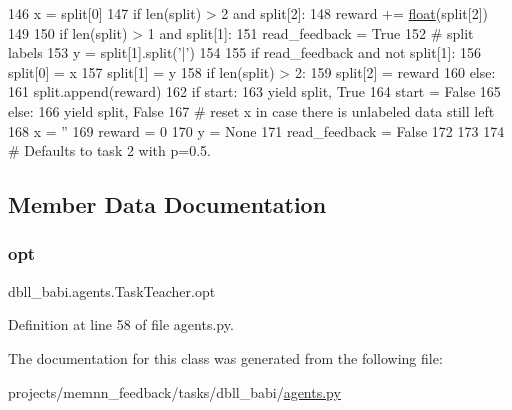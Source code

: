 \begin{DoxyCode}
146                         x = split[0]
147                 \textcolor{keywordflow}{if} len(split) > 2 \textcolor{keywordflow}{and} split[2]:
148                     reward += \hyperlink{namespaceprojects_1_1controllable__dialogue_1_1make__control__dataset_aa2b7207688c641dbc094ab44eca27113}{float}(split[2])
149 
150                 \textcolor{keywordflow}{if} len(split) > 1 \textcolor{keywordflow}{and} split[1]:
151                     read\_feedback = \textcolor{keyword}{True}
152                     \textcolor{comment}{# split labels}
153                     y = split[1].split(\textcolor{stringliteral}{'|'})
154 
155                 \textcolor{keywordflow}{if} read\_feedback \textcolor{keywordflow}{and} \textcolor{keywordflow}{not} split[1]:
156                     split[0] = x
157                     split[1] = y
158                     \textcolor{keywordflow}{if} len(split) > 2:
159                         split[2] = reward
160                     \textcolor{keywordflow}{else}:
161                         split.append(reward)
162                     \textcolor{keywordflow}{if} start:
163                         \textcolor{keywordflow}{yield} split, \textcolor{keyword}{True}
164                         start = \textcolor{keyword}{False}
165                     \textcolor{keywordflow}{else}:
166                         \textcolor{keywordflow}{yield} split, \textcolor{keyword}{False}
167                     \textcolor{comment}{# reset x in case there is unlabeled data still left}
168                     x = \textcolor{stringliteral}{''}
169                     reward = 0
170                     y = \textcolor{keywordtype}{None}
171                     read\_feedback = \textcolor{keyword}{False}
172 
173 
174 \textcolor{comment}{# Defaults to task 2 with p=0.5.}
\end{DoxyCode}


\subsection{Member Data Documentation}
\mbox{\label{classdbll__babi_1_1agents_1_1TaskTeacher_abe6872d5eda75ca8a15ecf4785086c48}} 
\subsubsection{\texorpdfstring{opt}{opt}}
{\footnotesize\ttfamily dbll\+\_\+babi.\+agents.\+Task\+Teacher.\+opt}



Definition at line 58 of file agents.\+py.



The documentation for this class was generated from the following file\+:\begin{DoxyCompactItemize}
\item 
projects/memnn\+\_\+feedback/tasks/dbll\+\_\+babi/\hyperlink{projects_2memnn__feedback_2tasks_2dbll__babi_2agents_8py}{agents.\+py}\end{DoxyCompactItemize}
